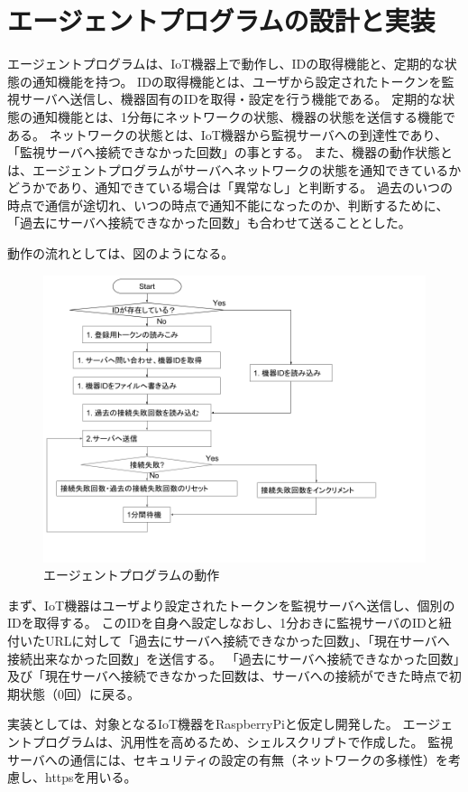 \section{エージェントプログラムの設計と実装}
エージェントプログラムは、IoT機器上で動作し、IDの取得機能と、定期的な状態の通知機能を持つ。
IDの取得機能とは、ユーザから設定されたトークンを監視サーバへ送信し、機器固有のIDを取得・設定を行う機能である。
定期的な状態の通知機能とは、1分毎にネットワークの状態、機器の状態を送信する機能である。
ネットワークの状態とは、IoT機器から監視サーバへの到達性であり、「監視サーバへ接続できなかった回数」の事とする。
また、機器の動作状態とは、エージェントプログラムがサーバへネットワークの状態を通知できているかどうかであり、通知できている場合は「異常なし」と判断する。
過去のいつの時点で通信が途切れ、いつの時点で通知不能になったのか、判断するために、「過去にサーバへ接続できなかった回数」も合わせて送ることとした。

動作の流れとしては、図のようになる。
\begin{figure}[htbp]
\includegraphics[width=16cm]{images/agent_flow.png}
\caption{エージェントプログラムの動作}
\label{fig:agent_flow}
\end{figure}
まず、IoT機器はユーザより設定されたトークンを監視サーバへ送信し、個別のIDを取得する。
このIDを自身へ設定しなおし、1分おきに監視サーバのIDと紐付いたURLに対して「過去にサーバへ接続できなかった回数」、「現在サーバへ接続出来なかった回数」を送信する。
「過去にサーバへ接続できなかった回数」及び「現在サーバへ接続できなかった回数は、サーバへの接続ができた時点で初期状態（0回）に戻る。

実装としては、対象となるIoT機器をRaspberryPiと仮定し開発した。
エージェントプログラムは、汎用性を高めるため、シェルスクリプトで作成した。
監視サーバへの通信には、セキュリティの設定の有無（ネットワークの多様性）を考慮し、httpsを用いる。

